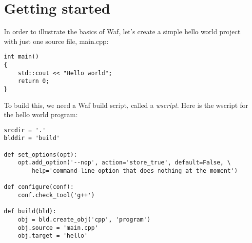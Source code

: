 \documentclass[a4paper,10pt]{article}
\title{\doctitle}
\date{May 2008}
\author{\authorName}
\def\doctitle{Waf user's guide - Waf 1.4.1}
\def\authorName{Carlos Rafael Giani\\Thomas Nagy}
\begin{document}




\maketitle

\tableofcontents

\newpage



\pagestyle{fancy}

\section{Getting started}
In order to illustrate the basics of Waf, let's create a simple hello world project with just one source file, main.cpp:

\begin{center}
	\begin{lstlisting}[caption=\footnotesize the main.cpp hello world code]
int main()
{
    std::cout << "Hello world";
    return 0;
}
	\end{lstlisting}
\end{center}

To build this, we need a Waf build script, called a \emph{wscript}.
Here is the wscript for the hello world program:

\begin{center}
	\begin{lstlisting}[caption=\footnotesize The hello world wscript]
srcdir = '.'
blddir = 'build'

def set_options(opt):
    opt.add_option('--nop', action='store_true', default=False, \
        help='command-line option that does nothing at the moment')

def configure(conf):
    conf.check_tool('g++')

def build(bld):
    obj = bld.create_obj('cpp', 'program')
    obj.source = 'main.cpp'
    obj.target = 'hello'
	\end{lstlisting}
\end{center}
\end{document}
